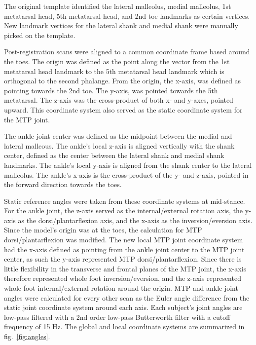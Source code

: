 \documentclass[defaultstyle,11pt]{comps}
\begin{document}
The original template identified the lateral malleolus, medial malleolus, 1st metatarsal head, 5th metatarsal head, and 2nd toe landmarks as certain vertices.
New landmark vertices for the lateral shank and medial shank were manually picked on the template.

Post-registration scans were aligned to a common coordinate frame based around the toes.
The origin was defined as the point along the vector from the 1st metatarsal head landmark to the 5th metatarsal head landmark which is orthogonal to the second phalange.
From the origin, the x-axis, was defined as pointing towards the 2nd toe.
The y-axis, was pointed towards the 5th metatarsal. The z-axis was the cross-product of both x- and y-axes, pointed upward.
This coordinate system also served as the static coordinate system for the MTP joint.

The ankle joint center was defined as the midpoint between the medial and lateral malleous.
The ankle's local z-axis is aligned vertically with the shank center, defined as the center between the lateral shank and medial shank landmarks.
The ankle's local y-axis is aligned from the shank center to the lateral malleolus.
The ankle's x-axis is the cross-product of the y- and z-axis, pointed in the forward direction towards the toes.

Static reference angles were taken from these coordinate systems at mid-stance.
For the ankle joint, the z-axis served as the internal/external rotation axis, the y-axis as the dorsi/plantarflexion axis, and the x-axis as the inversion/eversion axis.
Since the model's origin was at the toes, the calculation for MTP dorsi/plantarflexion was modified.
The new local MTP joint coordinate system had the x-axis defined as pointing from the ankle joint center to the MTP joint center, as such the y-axis represented MTP dorsi/plantarflexion.
Since there is little flexibility in the transverse and frontal planes of the MTP joint, the x-axis therefore represented whole foot inversion/eversion, and the z-axis represented whole foot internal/external rotation around the origin.
MTP and ankle joint angles were calculated for every other scan as the Euler angle difference from the static joint coordinate system around each axis.
Each subject's joint angles are low-pass filtered with a 2nd order low-pass Butterworth filter with a cutoff frequency of 15 Hz.
The global and local coordinate systems are summarized in fig.~\ref{fig:angles}.
\end{document}
